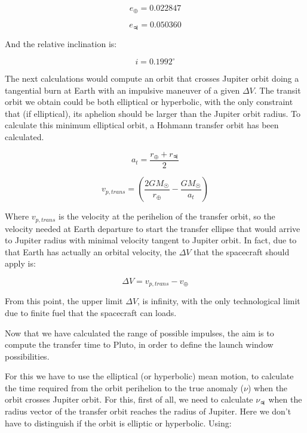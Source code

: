 \begin{equation*}
	e_{\oplus} = 0.022847
\end{equation*}

\begin{equation*}
	e_{\jupiter} = 0.050360
\end{equation*}

And the relative inclination is:

\begin{equation*}
	i = 0.1992^{\circ}
\end{equation*}

The next calculations would compute an orbit that crosses Jupiter orbit doing a
tangential burn at Earth with an impulsive maneuver of a given $\Delta V$. The
transit orbit we obtain could be both elliptical or hyperbolic, with the only
constraint that (if elliptical), its aphelion should be larger than the Jupiter
orbit radius. To calculate this minimum elliptical orbit, a Hohmann transfer
orbit has been calculated.

\begin{equation}
	a_t = \frac{r_{\oplus} + r_{\jupiter}}{2}
\end{equation}

\begin{equation}
	v_{p,trans} = \left( \frac{2GM_{\astrosun}}{r_{\oplus}} - \frac{GM_{\astrosun}}{a_t}  \right)
\end{equation}

Where $v_{p,trans}$ is the velocity at the perihelion of the transfer orbit,
so the velocity needed at Earth departure to start the transfer
ellipse that would arrive to Jupiter radius with minimal velocity tangent to Jupiter
orbit. In fact, due to that Earth has actually an orbital velocity, the $\Delta V$
that the spacecraft should apply is:

\begin{equation}
	\Delta V = v_{p,trans} - v_{\oplus}
\end{equation}

From this point, the upper limit $\Delta V$, is infinity, with the only technological
limit due to finite fuel that the spacecraft can loads.

Now that we have calculated the range of possible impulses, the aim is to compute
the transfer time to Pluto, in order to define the launch window possibilities.

For this we have to use the elliptical (or hyperbolic) mean motion, to calculate
the time required from the orbit perihelion to the true anomaly ($\nu$) when the
orbit crosses Jupiter orbit. For this, first of all, we need to calculate $\nu_{\jupiter}$
when the radius vector of the transfer orbit reaches the radius of Jupiter. Here
we don't have to distinguish if the orbit is elliptic or hyperbolic. Using:

